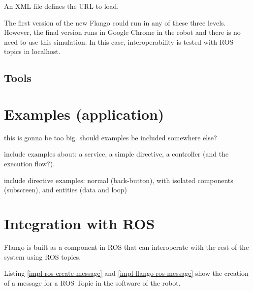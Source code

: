An \ac{XML} file defines the \ac{URL} to load.

The first version of the new Flango \cm could run in any of these three levels.
However, the final version runs in Google Chrome in the robot and there is no need to use this simulation.
In this case, interoperability is tested with \ac{ROS} topics in localhost.

\subsection{Tools}

\section{Examples (application)}
this is gonna be too big. should examples be included somewhere else?

include examples about: a service, a simple directive, a controller (and the execution flow?).

include directive examples: normal (back-button), with isolated components (subscreen), and entities (data and loop)

\section{Integration with ROS}
Flango \cm is built as a component in \ac{ROS} that can interoperate with the rest of the system using \ac{ROS} topics.

Listing \ref{impl-ros-create-message} and \ref{impl-flango-ros-message} show the creation of a message for a ROS Topic in the software of the robot.


